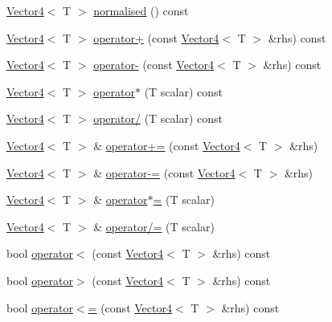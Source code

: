 \begin{DoxyCompactItemize}
\item 
\mbox{\hyperlink{class_vector4}{Vector4}}$<$ T $>$ \mbox{\hyperlink{class_vector4_ab03ee378cc4b82bcb2429ca4fe7fe53b}{normalised}} () const
\item 
\mbox{\hyperlink{class_vector4}{Vector4}}$<$ T $>$ \mbox{\hyperlink{class_vector4_a2a7fd8018536c8e7c61b8ee3975609f9}{operator+}} (const \mbox{\hyperlink{class_vector4}{Vector4}}$<$ T $>$ \&rhs) const
\item 
\mbox{\hyperlink{class_vector4}{Vector4}}$<$ T $>$ \mbox{\hyperlink{class_vector4_a41cb957697e0e937e0f7f4a5d459575a}{operator-\/}} (const \mbox{\hyperlink{class_vector4}{Vector4}}$<$ T $>$ \&rhs) const
\item 
\mbox{\hyperlink{class_vector4}{Vector4}}$<$ T $>$ \mbox{\hyperlink{class_vector4_ae808773615c6a150b3350744fc055f6a}{operator$\ast$}} (T scalar) const
\item 
\mbox{\hyperlink{class_vector4}{Vector4}}$<$ T $>$ \mbox{\hyperlink{class_vector4_a0d7e9b8d9b2d7033d49271105945db94}{operator/}} (T scalar) const
\item 
\mbox{\hyperlink{class_vector4}{Vector4}}$<$ T $>$ \& \mbox{\hyperlink{class_vector4_a0c84d5598e0a4e4421184ddc751d710b}{operator+=}} (const \mbox{\hyperlink{class_vector4}{Vector4}}$<$ T $>$ \&rhs)
\item 
\mbox{\hyperlink{class_vector4}{Vector4}}$<$ T $>$ \& \mbox{\hyperlink{class_vector4_a14caed9a7066f773974ab3bc5fb5e483}{operator-\/=}} (const \mbox{\hyperlink{class_vector4}{Vector4}}$<$ T $>$ \&rhs)
\item 
\mbox{\hyperlink{class_vector4}{Vector4}}$<$ T $>$ \& \mbox{\hyperlink{class_vector4_a3d716714c9bb1d78afb0fbc3df1b4f6a}{operator$\ast$=}} (T scalar)
\item 
\mbox{\hyperlink{class_vector4}{Vector4}}$<$ T $>$ \& \mbox{\hyperlink{class_vector4_a566b4c05fada0fe8823c56f6d407fb25}{operator/=}} (T scalar)
\item 
bool \mbox{\hyperlink{class_vector4_a089d05a63badd584f1ec737f0a0cd192}{operator$<$}} (const \mbox{\hyperlink{class_vector4}{Vector4}}$<$ T $>$ \&rhs) const
\item 
bool \mbox{\hyperlink{class_vector4_abb9410703aa2cd16a1eebdc8455b3684}{operator$>$}} (const \mbox{\hyperlink{class_vector4}{Vector4}}$<$ T $>$ \&rhs) const
\item 
bool \mbox{\hyperlink{class_vector4_a28a0678b1053a1854a15046a369dcb8d}{operator$<$=}} (const \mbox{\hyperlink{class_vector4}{Vector4}}$<$ T $>$ \&rhs) const
\item 

\end{DoxyCompactItemize}
